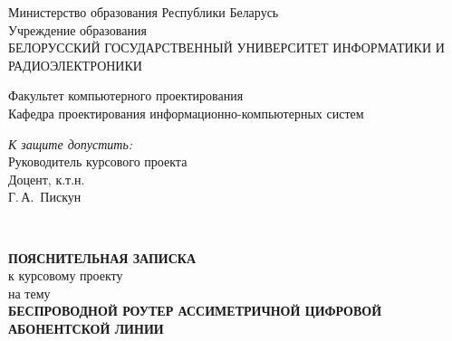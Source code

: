 

\begin{titlepage}
\begin{center}
Министерство образования Республики Беларусь\\[1.2em]
Учреждение образования\\[0.4em]
БЕЛОРУССКИЙ ГОСУДАРСТВЕННЫЙ УНИВЕРСИТЕТ ИНФОРМАТИКИ И РАДИОЭЛЕКТРОНИКИ\\[2.0em]
\end{center}
Факультет компьютерного проектирования\\
Кафедра проектирования информационно-компьютерных систем

\begin{flushright}
  \begin{minipage}{0.5\textwidth}
    \textit{К защите допустить:}\\
    Руководитель курсового проекта\\
    Доцент, к.т.н.\\
    \underline{\hspace*{2.8cm}} Г.\,А.~Пискун
  \end{minipage}\\[2em]
\end{flushright}

\begin{center}
  \textbf{ПОЯСНИТЕЛЬНАЯ ЗАПИСКА}\\
  к курсовому проекту\\
  на тему\\[2.0em]

  \textbf{БЕСПРОВОДНОЙ РОУТЕР АССИМЕТРИЧНОЙ ЦИФРОВОЙ АБОНЕНТСКОЙ ЛИНИИ}\\
\end{center}
\end{titlepage}
